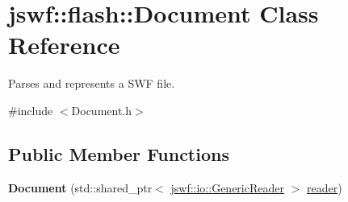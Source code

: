 \hypertarget{classjswf_1_1flash_1_1_document}{\section{jswf\+:\+:flash\+:\+:Document Class Reference}
\label{classjswf_1_1flash_1_1_document}
}


Parses and represents a {\ttfamily S\+W\+F file}.  




{\ttfamily \#include $<$Document.\+h$>$}

\subsection*{Public Member Functions}
\begin{DoxyCompactItemize}
\item 
\hypertarget{classjswf_1_1flash_1_1_document_ab5cf654ae338ce454f48e5c972bad5e7}{{\bfseries Document} (std\+::shared\+\_\+ptr$<$ \hyperlink{classjswf_1_1io_1_1_generic_reader}{jswf\+::io\+::\+Generic\+Reader} $>$ \hyperlink{classjswf_1_1flash_1_1_document_abc03a4a547e56b1117423589edad89e4}{reader})}\label{classjswf_1_1flash_1_1_document_ab5cf654ae338ce454f48e5c972bad5e7}

\end{DoxyCompactItemize}
